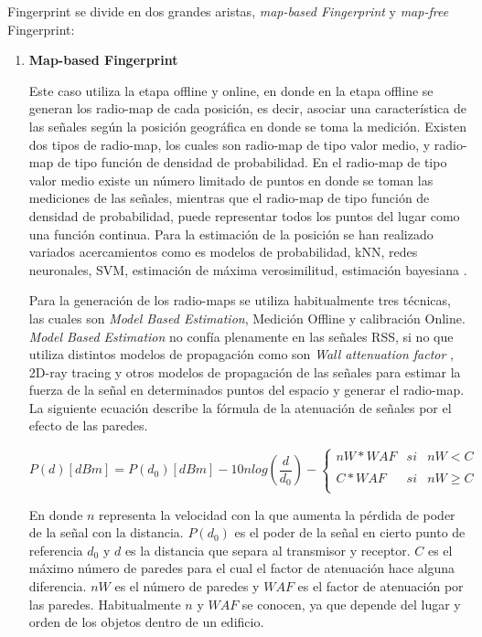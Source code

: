 Fingerprint se divide en dos grandes aristas, \textit{map-based Fingerprint} y \textit{map-free} Fingerprint:

\begin{enumerate}
\item \textbf{Map-based Fingerprint}

Este caso utiliza la etapa offline y online, en donde en la etapa offline se generan los radio-map de cada posición, es decir, asociar una característica de las señales según la posición geográfica en donde se toma la medición. Existen dos tipos de radio-map, los cuales son radio-map de tipo valor medio, y radio-map de tipo función de densidad de probabilidad. En el radio-map de tipo valor medio existe un número limitado de puntos en donde se toman las mediciones de las señales, mientras que el radio-map de tipo función de densidad de probabilidad, puede representar todos los puntos del lugar como una función continua. Para la estimación de la posición se han realizado variados acercamientos como es modelos de probabilidad, kNN, redes neuronales, SVM, estimación de máxima verosimilitud, estimación bayesiana \citep{Liu:2007:SWI:2220431.2221077, 1192765}.

Para la generación de los radio-maps se utiliza habitualmente tres técnicas, las cuales son \textit{Model Based Estimation}, Medición Offline y calibración Online. \textit{Model Based Estimation} no confía plenamente en las señales RSS, si no que utiliza distintos modelos de propagación como son \textit{Wall attenuation factor} \citep{Bahl00radar:an} , 2D-ray tracing y otros modelos de propagación de las señales para estimar la fuerza de la señal en determinados puntos del espacio y generar el radio-map. La siguiente ecuación describe la fórmula de la atenuación de señales por el efecto de las paredes.

\begin{equation}
P(d)[dBm] = P(d_{0})[dBm] - 10nlog (\frac{d}{d_{0}}) - \left\{ \begin{array}{lcc}
             nW*WAF &   si  & nW < C \\
             \\ C*WAF &  si & nW \geq C \\
             \end{array} \right.
\end{equation}

   

En donde \(n\) representa la velocidad con la que aumenta la pérdida de poder de la señal con la distancia. \(P(d_{0})\) es el poder de la señal en cierto punto de referencia \(d_{0}\) y \(d\) es la distancia que separa al transmisor y receptor. \(C\) es el máximo número de paredes para el cual el factor de atenuación hace alguna diferencia. \(nW\) es el número de paredes y \(WAF\) es el factor de atenuación por las paredes. Habitualmente \(n\) y \(WAF\) se conocen, ya que depende del lugar y orden de los objetos dentro de un edificio.


\end{enumerate}
